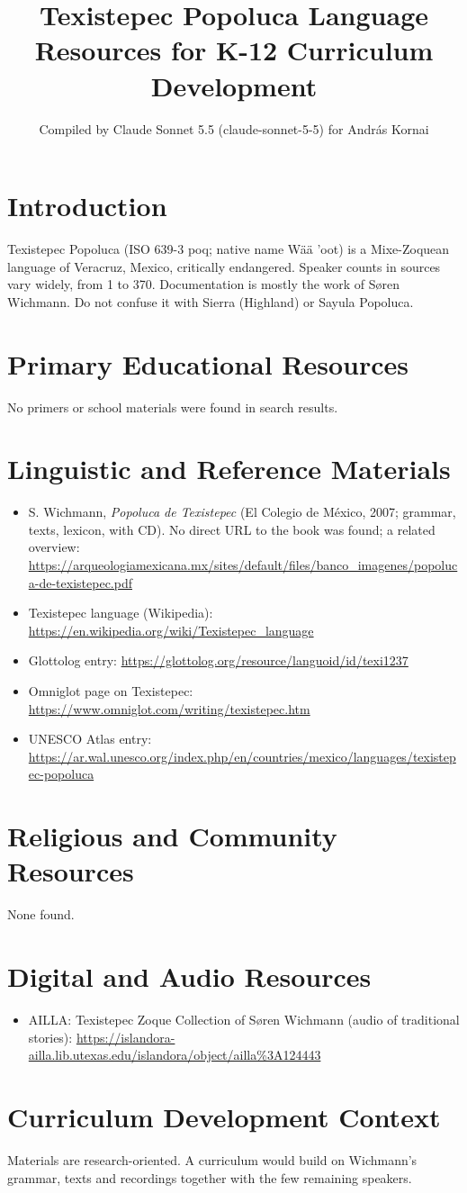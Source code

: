 \documentclass[12pt]{article}
\title{Texistepec Popoluca Language Resources for K-12 Curriculum Development}
\author{Compiled by Claude Sonnet 5.5 (claude-sonnet-5-5) for Andr\'as Kornai}
\date{}
\begin{document}
\maketitle
\section{Introduction}
Texistepec Popoluca (ISO 639-3 poq; native name W\"a\"a 'oot) is a Mixe-Zoquean language of Veracruz, Mexico, critically endangered. Speaker counts in sources vary widely, from 1 to 370. Documentation is mostly the work of S{\o}ren Wichmann. Do not confuse it with Sierra (Highland) or Sayula Popoluca.
\section{Primary Educational Resources}
No primers or school materials were found in search results.
\section{Linguistic and Reference Materials}
\begin{itemize}
\item S. Wichmann, \emph{Popoluca de Texistepec} (El Colegio de M\'exico, 2007; grammar, texts, lexicon, with CD). No direct URL to the book was found; a related overview: \url{https://arqueologiamexicana.mx/sites/default/files/banco_imagenes/popoluca-de-texistepec.pdf}
\item Texistepec language (Wikipedia): \url{https://en.wikipedia.org/wiki/Texistepec_language}
\item Glottolog entry: \url{https://glottolog.org/resource/languoid/id/texi1237}
\item Omniglot page on Texistepec: \url{https://www.omniglot.com/writing/texistepec.htm}
\item UNESCO Atlas entry: \url{https://ar.wal.unesco.org/index.php/en/countries/mexico/languages/texistepec-popoluca}
\end{itemize}
\section{Religious and Community Resources}
None found.
\section{Digital and Audio Resources}
\begin{itemize}
\item AILLA: Texistepec Zoque Collection of S{\o}ren Wichmann (audio of traditional stories): \url{https://islandora-ailla.lib.utexas.edu/islandora/object/ailla%3A124443}
\end{itemize}
\section{Curriculum Development Context}
Materials are research-oriented. A curriculum would build on Wichmann's grammar, texts and recordings together with the few remaining speakers.
\end{document}
